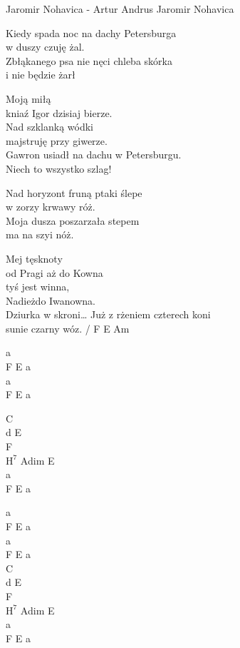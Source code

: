 {Jaromir Nohavica - Artur Andrus}
{Jaromir Nohavica}
\begin{text}
Kiedy spada noc na dachy Petersburga\\
w duszy czuję żal.\\
Zbłąkanego psa nie nęci chleba skórka\\
i nie będzie żarł

Moją miłą\\
kniaź Igor dzisiaj bierze.\\
Nad szklanką wódki\\
majstruję przy giwerze.\\
Gawron usiadł na dachu w Petersburgu.\\
Niech to wszystko szlag!

Nad horyzont fruną ptaki ślepe\\
w zorzy krwawy róż.\\
Moja dusza poszarzała stepem\\
ma na szyi nóż.

Mej tęsknoty\\
od Pragi aż do Kowna\\
tyś jest winna,\\
Nadieżdo Iwanowna.\\
Dziurka w skroni… Już z rżeniem czterech koni\\
sunie czarny wóz. / F E Am
\end{text}
\begin{chord}
a\\
F E a\\
a\\
F E a

C\\
d E\\
F\\
$\mathrm{H^7}$ Adim E\\
a\\
F E a

a\\
F E a\\
a\\
F E a\\

C\\
d E\\
F\\
$\mathrm{H^7}$ Adim E\\
a\\
F E a
\end{chord}
